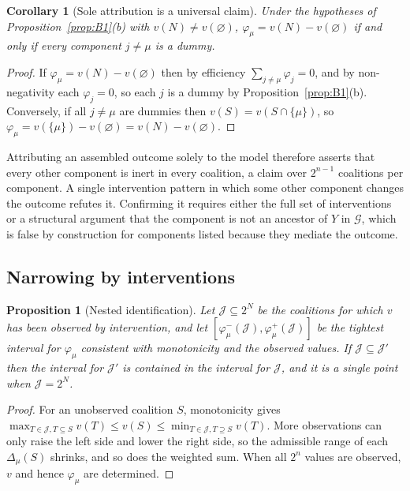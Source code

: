 \documentclass[11pt]{article}
\newtheorem{proposition}[theorem]{Proposition}
\newtheorem{corollary}[theorem]{Corollary}
\theoremstyle{definition}
\begin{document}
\begin{corollary}[Sole attribution is a universal claim]\label{cor:B2}
Under the hypotheses of Proposition~\ref{prop:B1}(b) with $v(N)\ne v(\varnothing)$, $\varphi_\mu=v(N)-v(\varnothing)$ if and only if every component $j\ne\mu$ is a dummy.
\end{corollary}
\begin{proof}
If $\varphi_\mu=v(N)-v(\varnothing)$ then by efficiency $\sum_{j\ne\mu}\varphi_j=0$, and by non-negativity each $\varphi_j=0$, so each $j$ is a dummy by Proposition~\ref{prop:B1}(b). Conversely, if all $j\ne\mu$ are dummies then $v(S)=v(S\cap\{\mu\})$, so $\varphi_\mu=v(\{\mu\})-v(\varnothing)=v(N)-v(\varnothing)$.
\end{proof}

Attributing an assembled outcome solely to the model therefore asserts that every other component is inert in every coalition, a claim over $2^{n-1}$ coalitions per component. A single intervention pattern in which some other component changes the outcome refutes it. Confirming it requires either the full set of interventions or a structural argument that the component is not an ancestor of $Y$ in $\mathcal{G}$, which is false by construction for components listed because they mediate the outcome.

\subsection{Narrowing by interventions}

\begin{proposition}[Nested identification]\label{prop:B3}
Let $\mathcal{J}\subseteq2^N$ be the coalitions for which $v$ has been observed by intervention, and let $[\varphi^-_\mu(\mathcal{J}),\varphi^+_\mu(\mathcal{J})]$ be the tightest interval for $\varphi_\mu$ consistent with monotonicity and the observed values. If $\mathcal{J}\subseteq\mathcal{J}'$ then the interval for $\mathcal{J}'$ is contained in the interval for $\mathcal{J}$, and it is a single point when $\mathcal{J}=2^N$.
\end{proposition}
\begin{proof}
For an unobserved coalition $S$, monotonicity gives $\max_{T\in\mathcal{J},T\subseteq S}v(T)\le v(S)\le\min_{T\in\mathcal{J},T\supseteq S}v(T)$. More observations can only raise the left side and lower the right side, so the admissible range of each $\Delta_\mu(S)$ shrinks, and so does the weighted sum. When all $2^n$ values are observed, $v$ and hence $\varphi_\mu$ are determined.
\end{proof}
\end{document}
